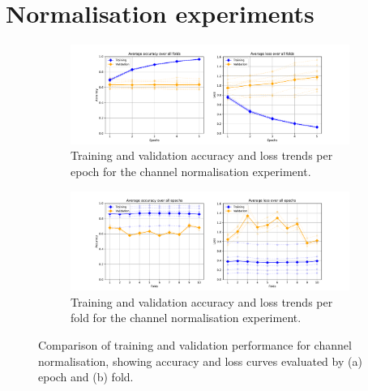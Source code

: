 
\newpage
\section{Normalisation experiments}\label{curves:normalisation}
\vfill
\begin{figure}[htbp]
    \centering
    \begin{subfigure}{\textwidth}
        \centering
        \includegraphics[trim={3cm 0 3cm 0.8cm},clip,width=\textwidth]{img/ch4/channel/channel_by_epoch.pdf}
        \caption{Training and validation accuracy and loss trends per epoch for the channel normalisation experiment.}
        \label{channel-norm-by-epoch}
    \end{subfigure}
    
    \vspace{1cm}
    
    \begin{subfigure}{\textwidth}
        \centering
        \includegraphics[trim={3cm 0 3cm 0.8cm},clip,width=\textwidth]{img/ch4/channel/channel_by_fold.pdf}
        \caption{Training and validation accuracy and loss trends per fold for the channel normalisation experiment.}
        \label{fig:channel-norm-by-fold}
    \end{subfigure}
    \caption{Comparison of training and validation performance for channel normalisation, showing accuracy and loss curves evaluated by (a) epoch and (b) fold.} 
    \label{fig:channel-norm-acc-loss}
\end{figure}
